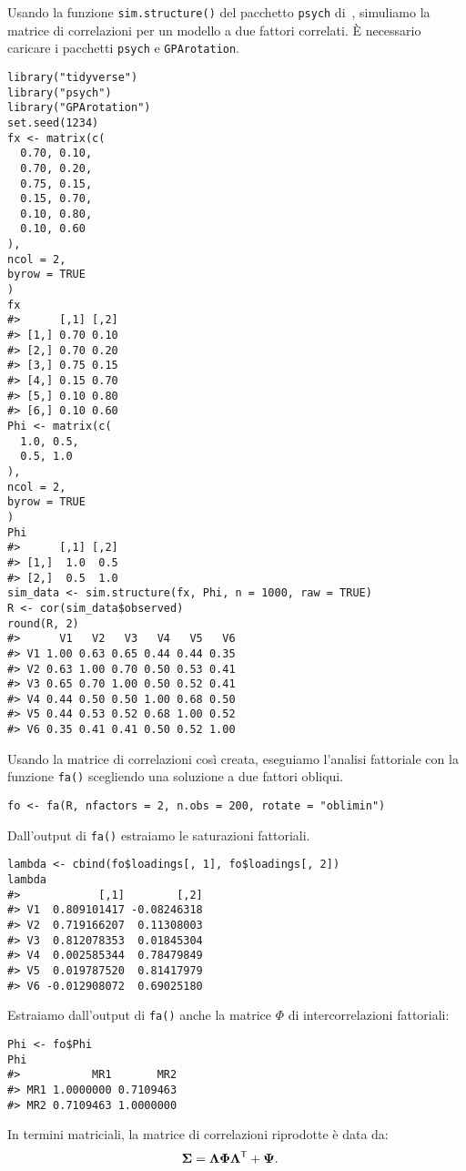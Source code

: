 \begin{exmp}
Usando la funzione \verb+sim.structure()+ del pacchetto \verb+psych+ di \R\,, simuliamo la matrice di correlazioni per un modello a due fattori correlati. È necessario caricare i pacchetti \verb+psych+ e \verb+GPArotation+.
\begin{lstlisting}
library("tidyverse")
library("psych")
library("GPArotation")
set.seed(1234)
fx <- matrix(c(
  0.70, 0.10,
  0.70, 0.20,
  0.75, 0.15,
  0.15, 0.70,
  0.10, 0.80,
  0.10, 0.60
),
ncol = 2,
byrow = TRUE
)
fx
#>      [,1] [,2]
#> [1,] 0.70 0.10
#> [2,] 0.70 0.20
#> [3,] 0.75 0.15
#> [4,] 0.15 0.70
#> [5,] 0.10 0.80
#> [6,] 0.10 0.60
Phi <- matrix(c(
  1.0, 0.5,
  0.5, 1.0
),
ncol = 2,
byrow = TRUE
)
Phi
#>      [,1] [,2]
#> [1,]  1.0  0.5
#> [2,]  0.5  1.0
sim_data <- sim.structure(fx, Phi, n = 1000, raw = TRUE)
R <- cor(sim_data$observed)
round(R, 2)
#>      V1   V2   V3   V4   V5   V6
#> V1 1.00 0.63 0.65 0.44 0.44 0.35
#> V2 0.63 1.00 0.70 0.50 0.53 0.41
#> V3 0.65 0.70 1.00 0.50 0.52 0.41
#> V4 0.44 0.50 0.50 1.00 0.68 0.50
#> V5 0.44 0.53 0.52 0.68 1.00 0.52
#> V6 0.35 0.41 0.41 0.50 0.52 1.00
\end{lstlisting}
Usando la matrice di correlazioni così creata, eseguiamo l'analisi fattoriale con la funzione \verb+fa()+ scegliendo una soluzione a due fattori obliqui.
\begin{lstlisting}
fo <- fa(R, nfactors = 2, n.obs = 200, rotate = "oblimin")
\end{lstlisting}
Dall'output di \verb+fa()+ estraiamo le saturazioni fattoriali.
\begin{lstlisting}
lambda <- cbind(fo$loadings[, 1], fo$loadings[, 2])
lambda
#>            [,1]        [,2]
#> V1  0.809101417 -0.08246318
#> V2  0.719166207  0.11308003
#> V3  0.812078353  0.01845304
#> V4  0.002585344  0.78479849
#> V5  0.019787520  0.81417979
#> V6 -0.012908072  0.69025180
\end{lstlisting}
Estraiamo dall'output di \verb+fa()+ anche la matrice $\Phi$ di intercorrelazioni fattoriali:
\begin{lstlisting}
Phi <- fo$Phi
Phi
#>           MR1       MR2
#> MR1 1.0000000 0.7109463
#> MR2 0.7109463 1.0000000
\end{lstlisting}
In termini matriciali, la matrice di correlazioni riprodotte è data da: 
\begin{align}
\boldsymbol{\Sigma} &=\boldsymbol{\Lambda} \boldsymbol{\Phi} \boldsymbol{\Lambda}^{\ensuremath{\mathsf{T}}} + \boldsymbol{\Psi}. \notag
\end{align}

\end{exmp}
